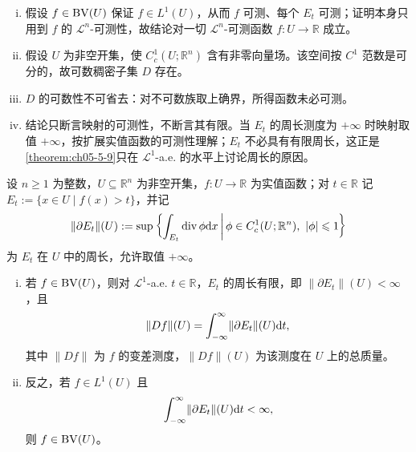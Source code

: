 \documentclass[../../main.tex]{subfiles}%
\begin{document}
\begin{remark}\label{remark:ch05-lem-5-1-条件}
\begin{enumerate}[(i)]
\item 假设 $f\in\mathrm{BV}(U)$ 保证 $f\in L^1(U)$，从而 $f$ 可测、每个 $E_t$ 可测；证明本身只用到 $f$ 的 $\mathcal{L}^n$-可测性，故结论对一切 $\mathcal{L}^n$-可测函数 $f:U\to\mathbb{R}$ 成立。
\item 假设 $U$ 为非空开集，使 $C_c^1(U;\mathbb{R}^n)$ 含有非零向量场。该空间按 $C^1$ 范数是可分的，故可数稠密子集 $D$ 存在。
\item $D$ 的可数性不可省去：对不可数族取上确界，所得函数未必可测。
\item 结论只断言映射的可测性，不断言其有限。当 $E_t$ 的周长测度为 $+\infty$ 时映射取值 $+\infty$，按扩展实值函数的可测性理解；$E_t$ 不必具有有限周长，这正是\cref{theorem:ch05-5-9}只在 $\mathcal{L}^1$-a.e. 的水平上讨论周长的原因。%
\end{enumerate}
\end{remark}

\begin{theorem}[$\BV$ 函数的余面积公式]\label{theorem:ch05-5-9}
设 $n\geqslant1$ 为整数，$U\subseteq\mathbb{R}^n$ 为非空开集，$f:U\to\mathbb{R}$ 为实值函数；对 $t\in\mathbb{R}$ 记 $E_t:=\{x\in U\mid f(x)>t\}$，并记
\begin{align*}
\lVert\partial E_t\rVert(U):=\sup\left\{\int_{E_t}\diver\phi\diff x\,\middle|\,\phi\in C_c^1(U;\mathbb{R}^n),\ \lvert\phi\rvert\leqslant1\right\}
\end{align*}
为 $E_t$ 在 $U$ 中的周长，允许取值 $+\infty$。
\begin{enumerate}[(i)]
\item 若 $f\in\mathrm{BV}(U)$，则对 $\mathcal{L}^1$-a.e. $t\in\mathbb{R}$，$E_t$ 的周长有限，即 $\lVert\partial E_t\rVert(U)<\infty$，且
\begin{align*}
\lVert Df\rVert(U)=\int_{-\infty}^{\infty}\lVert\partial E_t\rVert(U)\mathrm{d} t,
\end{align*}
其中 $\lVert Df\rVert$ 为 $f$ 的变差测度，$\lVert Df\rVert(U)$ 为该测度在 $U$ 上的总质量。
\item 反之，若 $f\in L^1(U)$ 且
\begin{align*}
\int_{-\infty}^{\infty}\lVert\partial E_t\rVert(U)\mathrm{d} t<\infty,
\end{align*}
则 $f\in\mathrm{BV}(U)$。
\end{enumerate}
\end{theorem}
\end{document}
